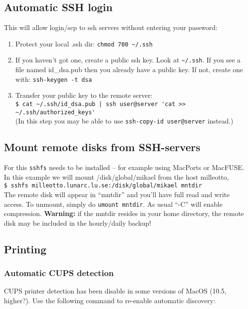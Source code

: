 \documentclass[a4paper,10pt]{article}
\begin{document}
\subsection{Automatic SSH login}
This will allow login/scp to ssh servers without entering your password:
\begin{enumerate}
\item Protect your local .ssh dir: \verb"chmod 700 ~/.ssh"

\item If you haven't got one, create a public ssh key.
Look at \verb"~/.ssh". If you see a file named id\_dsa.pub then you already have a public key. If not, create one with: \verb"ssh-keygen -t dsa"

\item Transfer your public key to the remote server:\\

\verb"$ cat ~/.ssh/id_dsa.pub | ssh user@server 'cat >> ~/.ssh/authorized_keys'"\\

(In this step you may be able to use \verb"ssh-copy-id user@server" instead.)
\end{enumerate}

\subsection{Mount remote disks from SSH-servers}
For this \verb+sshfs+ needs to be installed -- for example using MacPorts or MacFUSE. In this example we will mount /disk/global/mikael from the host milleotto,\\

\verb+$ sshfs milleotto.lunarc.lu.se:/disk/global/mikael mntdir+\\

\noindent The remote disk will appear in ``mntdir'' and you'll have full read and write access. To unmount, simply do \verb+umount mntdir+. As usual ``-C'' will enable compression. \textbf{Warning:} if the mntdir resides in your home directory, the remote disk may be included in the hourly/daily backup!

\subsection{Printing}
\subsubsection{Automatic CUPS detection}
CUPS printer detection has been disable in some versions of MacOS (10.5, higher?). Use the following command to re-enable automatic discovery:\\
\end{document}
